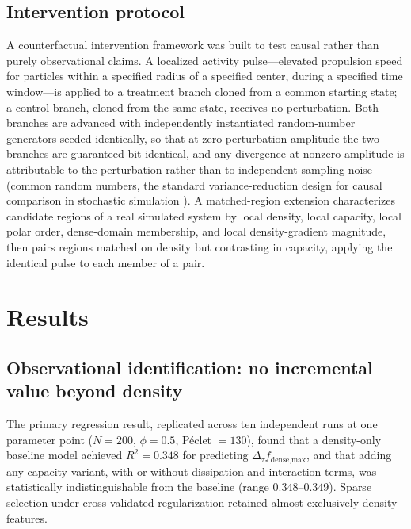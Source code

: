 \documentclass[11pt]{article}
\begin{document}
\subsection{Intervention protocol}

A counterfactual intervention framework was built to test causal rather than purely observational claims. A localized activity pulse---elevated propulsion speed for particles within a specified radius of a specified center, during a specified time window---is applied to a treatment branch cloned from a common starting state; a control branch, cloned from the same state, receives no perturbation. Both branches are advanced with independently instantiated random-number generators seeded identically, so that at zero perturbation amplitude the two branches are guaranteed bit-identical, and any divergence at nonzero amplitude is attributable to the perturbation rather than to independent sampling noise (common random numbers, the standard variance-reduction design for causal comparison in stochastic simulation \cite{Glasserman2004}). A matched-region extension characterizes candidate regions of a real simulated system by local density, local capacity, local polar order, dense-domain membership, and local density-gradient magnitude, then pairs regions matched on density but contrasting in capacity, applying the identical pulse to each member of a pair.

\section{Results}

\subsection{Observational identification: no incremental value beyond density}

The primary regression result, replicated across ten independent runs at one parameter point ($N=200$, $\phi=0.5$, P\'eclet $=130$), found that a density-only baseline model achieved $R^2=0.348$ for predicting $\Delta_\tau f_{\text{dense,max}}$, and that adding any capacity variant, with or without dissipation and interaction terms, was statistically indistinguishable from the baseline (range $0.348$--$0.349$). Sparse selection under cross-validated regularization retained almost exclusively density features.
\end{document}
